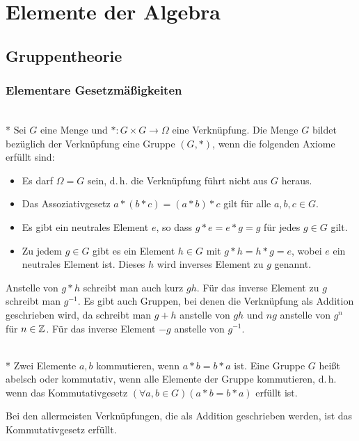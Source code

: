 
\chapter{Elemente der Algebra}

\section{Gruppentheorie}

\subsection{Elementare Gesetzmäßigkeiten}
\begin{Definition}[Gruppe]\mbox{}\\*
Sei $G$ eine Menge und $*\colon G\times G\to\Omega$ eine Verknüpfung.
Die Menge $G$ bildet bezüglich der Verknüpfung eine Gruppe $(G,*)$,
wenn die folgenden Axiome erfüllt sind:
\begin{itemize}
\item[\strong{(E)}]
Es darf $\Omega=G$ sein, d.\,h. die Verknüpfung führt nicht aus $G$ heraus.
\item[\strong{(A)}]
Das Assoziativgesetz $a*(b*c)=(a*b)*c$ gilt für alle $a,b,c\in G$.
\item[\strong{(N)}]
Es gibt ein neutrales Element $e$, so dass $g*e=e*g=g$ für jedes
$g\in G$ gilt.
\item[\strong{(I)}]
Zu jedem $g\in G$ gibt es ein Element $h\in G$ mit $g*h=h*g=e$,
wobei $e$ ein neutrales Element ist. Dieses $h$ wird
inverses Element zu $g$ genannt.
\end{itemize}
\end{Definition}
Anstelle von $g*h$ schreibt man auch kurz $gh$. Für das inverse Element
zu $g$ schreibt man $g^{-1}$. Es gibt auch Gruppen,
bei denen die Verknüpfung als Addition geschrieben wird, da schreibt
man $g+h$ anstelle von $gh$ und $ng$ anstelle von $g^n$ für $n\in\mathbb Z$.
Für das inverse Element $-g$ anstelle von $g^{-1}$.

\begin{Definition}\mbox{}\\*
Zwei Elemente $a,b$ kommutieren, wenn $a*b=b*a$ ist.
Eine Gruppe $G$ heißt abelsch oder kommutativ, wenn alle
Elemente der Gruppe kommutieren, d.\,h. wenn
das Kommutativgesetz $(\forall a,b\in G)(a*b=b*a)$ erfüllt ist.
\end{Definition}
Bei den allermeisten Verknüpfungen, die als Addition 
geschrieben werden, ist das Kommutativgesetz erfüllt.

